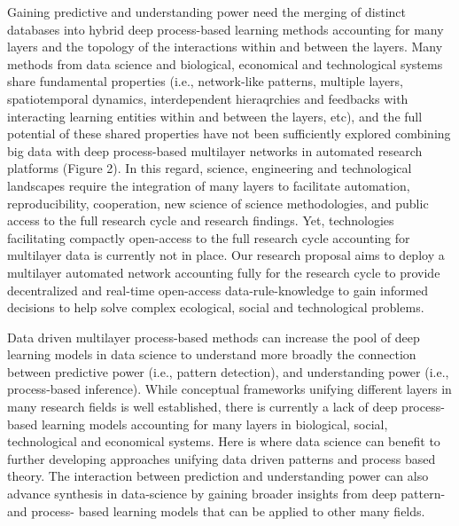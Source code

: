 \documentclass[authoryear,1p,12pt]{elsarticle}
\begin{document}
Gaining predictive and understanding power need the merging of
distinct databases into hybrid deep process-based learning methods
accounting for many layers and the topology of the interactions within
and between the
layers\citep{Schmidhuber:2015,Ghahramani:2015,Melianetal:2018,Reichsteietal2019}. Many
methods from data science and biological, economical and technological
systems share fundamental properties (i.e., network-like patterns,
multiple layers, spatiotemporal dynamics, interdependent hieraqrchies
and feedbacks with interacting learning entities within and between
the layers, etc), and the full potential of these shared properties
have not been sufficiently explored combining big data with deep
process-based multilayer networks in automated research platforms
(Figure 2). In this regard, science, engineering and technological
landscapes require the integration of many layers to facilitate
automation, reproducibility, cooperation, new science of science
methodologies, and public access to the full research cycle and
research findings. Yet, technologies facilitating compactly
open-access to the full research cycle accounting for multilayer data
is currently not in place. Our research proposal aims to deploy a
multilayer automated network accounting fully for the research cycle
to provide decentralized and real-time open-access data-rule-knowledge
to gain informed decisions to help solve complex ecological, social
and technological problems.

Data driven multilayer process-based methods can increase the pool of
deep learning models in data science to understand more broadly the
connection between predictive power (i.e., pattern detection), and
understanding power (i.e., process-based inference). While conceptual
frameworks unifying different layers in many research fields is well
established, there is currently a lack of deep process-based learning
models accounting for many layers in biological, social, technological
and economical systems. Here is where data science can benefit to
further developing approaches unifying data driven patterns and
process based theory. The interaction between prediction and
understanding power can also advance synthesis in data-science by
gaining broader insights from deep pattern- and process- based
learning models that can be applied to other many fields.
\end{document}
